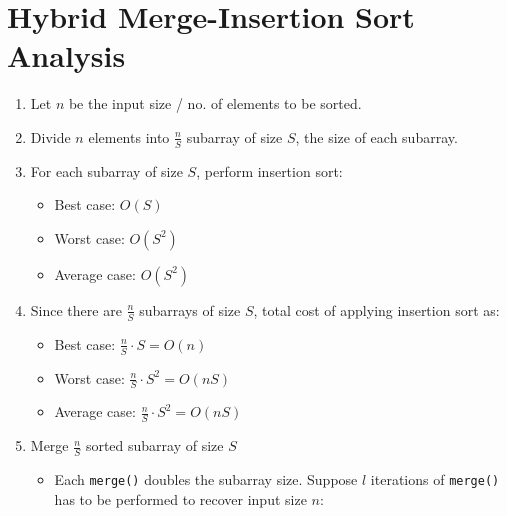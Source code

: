 \maketitle

\section{Hybrid Merge-Insertion Sort Analysis}
\begin{enumerate}
\item Let $n$ be the input size / no. of elements to be sorted.
\item Divide $n$ elements into $\frac{n}{S}$ subarray of size $S$, the size of each subarray.
\item For each subarray of size $S$, perform insertion sort:
  \begin{itemize}
    \item Best case: $O(S)$
    \item Worst case: $O(S^2)$
    \item Average case: $O(S^2)$
  \end{itemize}
\item Since there are $\frac{n}{S}$ subarrays of size $S$, total cost of applying insertion sort as:
  \begin{itemize}
    \item Best case: $\frac{n}{S} \cdot S = O(n)$
    \item Worst case: $\frac{n}{S} \cdot S^2 = O(nS)$
    \item Average case: $\frac{n}{S} \cdot S^2 = O(nS)$
  \end{itemize}
   \pagebreak
\item Merge $\frac{n}{S}$ sorted subarray of size $S$ \\
  \begin{itemize}
    \item Each \texttt{merge()} doubles the subarray size. Suppose $l$ iterations of
      \texttt{merge()} has to be performed to recover input size $n$:
      \begin{equation}

\end{equation}
\end{itemize}
\end{enumerate}
